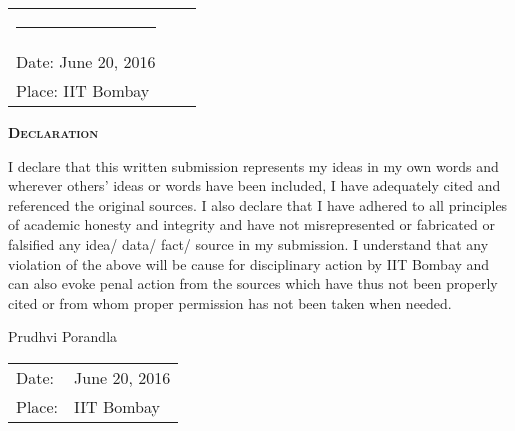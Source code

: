 \vspace{5mm}
\begin{tabular}{lll}
	\rule{40mm}{0pt}        & \rule{50mm}{0pt}       & \rule{60mm}{0pt} \\
	Date: June 20, 2016		&                        & \\
	Place: IIT Bombay       &                        & \\
\end{tabular}
\newpage
\thispagestyle{empty}
\begin{center}
	\begin{Huge}
		\textsc{\textbf{Declaration}}
	\end{Huge}
\end{center}

\vspace{0.5in}

 I declare that this written submission represents my ideas in my own words and wherever others' ideas or words have been included, I have adequately cited and referenced the original sources. I also declare that I have adhered to all principles of academic honesty and integrity and have not misrepresented or fabricated or falsified any idea/ data/ fact/ source in my submission. I understand that any violation of the above will be cause for disciplinary action by IIT Bombay and can also evoke penal action from the sources which have thus not been properly cited or from whom proper permission has not been taken when needed.

\vspace{1.5in}
	\hfill Prudhvi Porandla\\
	\noindent
	\begin{tabular}{ll}
		Date: & June 20, 2016\\ \vspace{30pt}
		Place: & IIT Bombay\\
	\end{tabular}

		\newpage
		\thispagestyle{empty}    %




